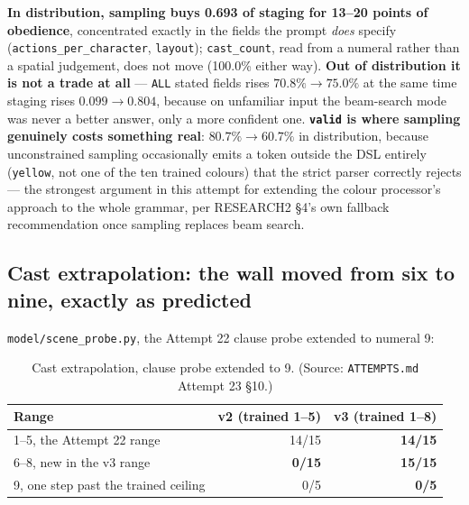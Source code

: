 \documentclass[11pt]{article}
\newcommand{\secsym}{\S}
\begin{document}
\textbf{In distribution, sampling buys 0.693 of staging for 13--20 points
of obedience}, concentrated exactly in the fields the prompt \emph{does}
specify (\texttt{actions\_per\_character}, \texttt{layout});
\texttt{cast\_count}, read from a numeral rather than a spatial
judgement, does not move (100.0\% either way). \textbf{Out of
distribution it is not a trade at all} --- \texttt{ALL} stated fields
rises $70.8\% \rightarrow 75.0\%$ at the same time staging rises $0.099
\rightarrow 0.804$, because on unfamiliar input the beam-search mode was
never a better answer, only a more confident one. \textbf{\texttt{valid}
is where sampling genuinely costs something real}: $80.7\% \rightarrow
60.7\%$ in distribution, because unconstrained sampling occasionally
emits a token outside the DSL entirely (\texttt{yellow}, not one of the
ten trained colours) that the strict parser correctly rejects --- the
strongest argument in this attempt for extending the colour processor's
approach to the whole grammar, per RESEARCH2 \secsym4's own fallback
recommendation once sampling replaces beam search.

\subsection{Cast extrapolation: the wall moved from six to nine, exactly as predicted}
\label{sec:castextrapolation}

\texttt{model/scene\_probe.py}, the Attempt 22 clause probe extended to
numeral 9:

\begin{table}[h]
\centering
\caption{Cast extrapolation, clause probe extended to 9.
(Source: \texttt{ATTEMPTS.md} Attempt 23 \secsym10.)}
\label{tab:castextrapolation}
\begin{tabular}{@{}lrr@{}}
\toprule
Range & v2 (trained 1--5) & v3 (trained 1--8) \\
\midrule
1--5, the Attempt 22 range & 14/15 & \textbf{14/15} \\
6--8, new in the v3 range & \textbf{0/15} & \textbf{15/15} \\
9, one step past the trained ceiling & 0/5 & \textbf{0/5} \\
\bottomrule
\end{tabular}
\end{table}
\end{document}
